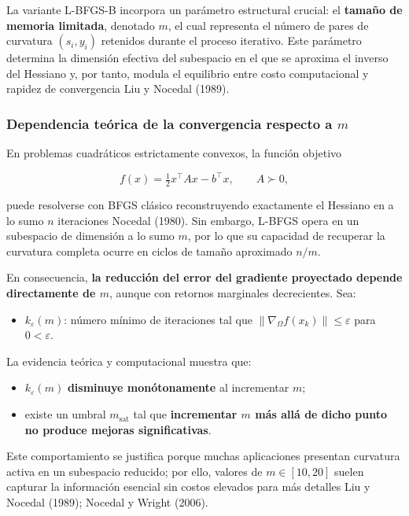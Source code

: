 \documentclass[
  spanish,
  us-letterpaper,
  DIV=11,
  numbers=noendperiod]{scrreprt}
\providecommand{\tightlist}{%
  \setlength{\itemsep}{0pt}\setlength{\parskip}{0pt}}
\numberwithin{equation}{section}
\begin{document}
La variante L-BFGS-B incorpora un parámetro estructural crucial: el
\textbf{tamaño de memoria limitada}, denotado \(m\), el cual representa
el número de pares de curvatura \((s_i, y_i)\) retenidos durante el
proceso iterativo. Este parámetro determina la dimensión efectiva del
subespacio en el que se aproxima el inverso del Hessiano y, por tanto,
modula el equilibrio entre costo computacional y rapidez de convergencia
Liu y Nocedal (1989).

\subsubsection{\texorpdfstring{Dependencia teórica de la convergencia
respecto a
\(m\)}{Dependencia teórica de la convergencia respecto a m}}\label{dependencia-teuxf3rica-de-la-convergencia-respecto-a-m}

En problemas cuadráticos estrictamente convexos, la función objetivo

\[
f(x) = \tfrac{1}{2} x^\top A x - b^\top x, \qquad A \succ 0,
\]

puede resolverse con BFGS clásico reconstruyendo exactamente el Hessiano
en a lo sumo \(n\) iteraciones Nocedal (1980). Sin embargo, L-BFGS opera
en un subespacio de dimensión a lo sumo \(m\), por lo que su capacidad
de recuperar la curvatura completa ocurre en ciclos de tamaño aproximado
\(n/m\).

En consecuencia, \textbf{la reducción del error del gradiente proyectado
depende directamente de \(m\)}, aunque con retornos marginales
decrecientes. Sea:

\begin{itemize}
\tightlist
\item
  \(k_{\varepsilon}(m)\): número mínimo de iteraciones tal que
  \(\|\nabla_\Omega f(x_k)\| \le \varepsilon\) para \(0 <\varepsilon\).
\end{itemize}

La evidencia teórica y computacional muestra que:

\begin{itemize}
\tightlist
\item
  \(k_{\varepsilon}(m)\) \textbf{disminuye monótonamente} al incrementar
  \(m\);
\item
  existe un umbral \(m_{\text{sat}}\) tal que \textbf{incrementar \(m\)
  más allá de dicho punto no produce mejoras significativas}.
\end{itemize}

Este comportamiento se justifica porque muchas aplicaciones presentan
curvatura activa en un subespacio reducido; por ello, valores de
\(m \in [10,20]\) suelen capturar la información esencial sin costos
elevados para más detalles Liu y Nocedal (1989); Nocedal y Wright
(2006).
\end{document}
